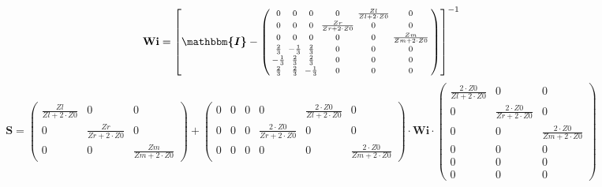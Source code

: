\begin{equation} \mathbf{Wi} =  \left[ \boldsymbol{\mathbbm{I}}  -
\left(\begin{smallmatrix} 0 & 0 & 0 & 0 & \frac{Zl}{Zl+2\cdot Z0} & 0
\\ 0 & 0 & 0 & \frac{Zr}{Zr+2\cdot Z0} & 0 & 0 \\ 0 & 0 & 0 & 0 & 0 &
\frac{Zm}{Zm+2\cdot Z0} \\ \frac{2}{3} & -\frac{1}{3} & \frac{2}{3} &
0 & 0 & 0 \\ -\frac{1}{3} & \frac{2}{3} & \frac{2}{3} & 0 & 0 & 0 \\
\frac{2}{3} & \frac{2}{3} & -\frac{1}{3} & 0 & 0 & 0
\end{smallmatrix}\right) \right]^{-1}  \end{equation}
\begin{equation} \mathbf{S} = \left(\begin{smallmatrix}
\frac{Zl}{Zl+2\cdot Z0} & 0 & 0 \\ 0 & \frac{Zr}{Zr+2\cdot Z0} & 0 \\
0 & 0 & \frac{Zm}{Zm+2\cdot Z0} \end{smallmatrix}\right) +
\left(\begin{smallmatrix} 0 & 0 & 0 & 0 & \frac{2\cdot Z0}{Zl+2\cdot
Z0} & 0 \\ 0 & 0 & 0 & \frac{2\cdot Z0}{Zr+2\cdot Z0} & 0 & 0 \\ 0 & 0
& 0 & 0 & 0 & \frac{2\cdot Z0}{Zm+2\cdot Z0} \end{smallmatrix}\right)
\cdot \mathbf{Wi} \cdot\left(\begin{smallmatrix} \frac{2\cdot
Z0}{Zl+2\cdot Z0} & 0 & 0 \\ 0 & \frac{2\cdot Z0}{Zr+2\cdot Z0} & 0 \\
0 & 0 & \frac{2\cdot Z0}{Zm+2\cdot Z0} \\ 0 & 0 & 0 \\ 0 & 0 & 0 \\ 0
& 0 & 0 \end{smallmatrix}\right) \end{equation}
